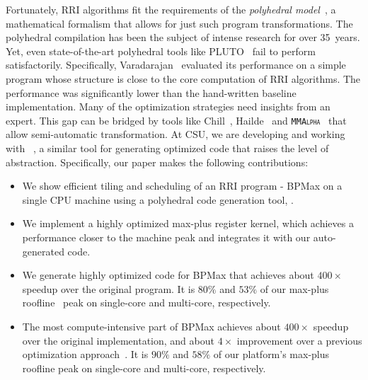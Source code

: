 Fortunately, RRI algorithms fit the requirements of the \emph{polyhedral model}~\cite{sanjay-fst-tcs, sanjay-thesis, sanjay-dc, quinton84c, quinton, quinton-jvsp89, feautrier91, feautrier92a, feautrier92b}, a mathematical formalism that allows for just such program transformations. The polyhedral compilation has been the subject of intense research for over 35~years. Yet, even state-of-the-art polyhedral tools like  PLUTO~\cite{Bondhugula2015PLuToAP, Bondhugula2008} fail to perform satisfactorily. Specifically, Varadarajan~\cite{Varadarajan2016} evaluated its performance on a simple program whose structure is close to the core computation of RRI algorithms. The performance was significantly lower than the hand-written baseline implementation. Many of the optimization strategies need insights from an expert. This gap can be bridged by tools like Chill~\cite{Chen08chill:a}, Hailde~\cite{RaganKelley2013} and \textsc{\texttt{MMAlpha}}~\cite{guillou-mma} that allow semi-automatic transformation. At CSU, we are developing and working with \textbf{\alphaz}~\cite{sanjay-lcpc2012}, a similar tool for generating optimized code that raises the level of abstraction. Specifically, our paper makes the following contributions:
\begin{itemize}
\item We show efficient tiling and scheduling of an RRI program - BPMax on a single CPU machine using a polyhedral code generation tool, \textbf{\alphaz}.

\item  We implement a highly optimized max-plus register kernel, which achieves a performance closer to the machine peak and integrates it with our auto-generated code.

\item We generate highly optimized code for BPMax that achieves about $400\times$ speedup over the original program. It is $80\%$ and $53\%$ of our max-plus roofline~\cite{Williams2008} peak on single-core and multi-core, respectively.

\item The most compute-intensive part of BPMax achieves about $400\times$ speedup over the original implementation, and about $4\times$ improvement over a previous optimization approach~\cite{Mondal2021}. It is $90\%$ and $58\%$ of our platform's max-plus roofline peak on single-core and multi-core, respectively.
\end{itemize}


